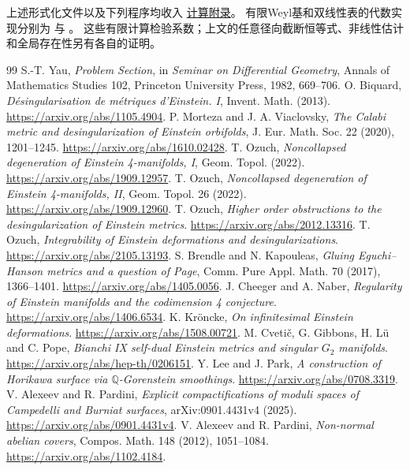 \documentclass[UTF8,a4paper,11pt,fontset=fandol]{ctexart}
\numberwithin{equation}{section}
\theoremstyle{definition}
\begin{document}
上述形式化文件以及下列程序均收入
\href{../references/computations.md}{计算附录}。
有限Weyl基和双线性表的代数实现分别为
与
。
这些有限计算检验系数；上文的任意径向截断恒等式、非线性估计和全局存在性另有各自的证明。
\clearpage
\begin{thebibliography}{99}
 S.-T. Yau, \emph{Problem Section}, in \emph{Seminar on Differential Geometry}, Annals of Mathematics Studies 102, Princeton University Press, 1982, 669--706.
 O. Biquard, \emph{D\'esingularisation de m\'etriques d'Einstein. I}, Invent. Math. (2013). \url{https://arxiv.org/abs/1105.4904}.
 P. Morteza and J. A. Viaclovsky, \emph{The Calabi metric and desingularization of Einstein orbifolds}, J. Eur. Math. Soc. 22 (2020), 1201--1245. \url{https://arxiv.org/abs/1610.02428}.
 T. Ozuch, \emph{Noncollapsed degeneration of Einstein 4-manifolds, I}, Geom. Topol. (2022). \url{https://arxiv.org/abs/1909.12957}.
 T. Ozuch, \emph{Noncollapsed degeneration of Einstein 4-manifolds, II}, Geom. Topol. 26 (2022). \url{https://arxiv.org/abs/1909.12960}.
 T. Ozuch, \emph{Higher order obstructions to the desingularization of Einstein metrics}. \url{https://arxiv.org/abs/2012.13316}.
 T. Ozuch, \emph{Integrability of Einstein deformations and desingularizations}. \url{https://arxiv.org/abs/2105.13193}.
 S. Brendle and N. Kapouleas, \emph{Gluing Eguchi--Hanson metrics and a question of Page}, Comm. Pure Appl. Math. 70 (2017), 1366--1401. \url{https://arxiv.org/abs/1405.0056}.
 J. Cheeger and A. Naber, \emph{Regularity of Einstein manifolds and the codimension 4 conjecture}. \url{https://arxiv.org/abs/1406.6534}.
 K. Kr\"oncke, \emph{On infinitesimal Einstein deformations}. \url{https://arxiv.org/abs/1508.00721}.
 M. Cveti\v c, G. Gibbons, H. L\"u and C. Pope, \emph{Bianchi IX self-dual Einstein metrics and singular $G_2$ manifolds}. \url{https://arxiv.org/abs/hep-th/0206151}.
 Y. Lee and J. Park, \emph{A construction of Horikawa surface via $\mathbb Q$-Gorenstein smoothings}. \url{https://arxiv.org/abs/0708.3319}.
 V. Alexeev and R. Pardini, \emph{Explicit compactifications of moduli spaces of Campedelli and Burniat surfaces}, arXiv:0901.4431v4 (2025). \url{https://arxiv.org/abs/0901.4431v4}.
 V. Alexeev and R. Pardini, \emph{Non-normal abelian covers}, Compos. Math. 148 (2012), 1051--1084. \url{https://arxiv.org/abs/1102.4184}.
\end{thebibliography}
\end{document}
